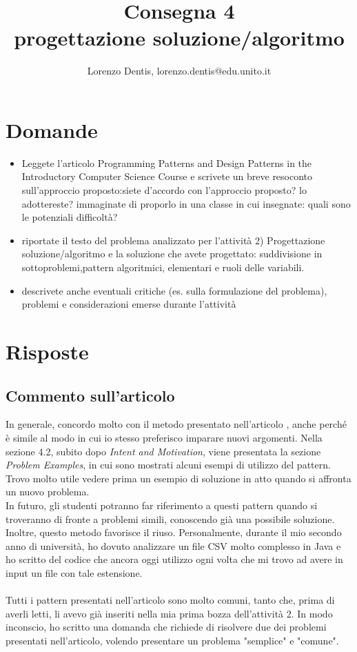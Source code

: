 \documentclass[a4paper]{article}
\begin{document}
\author{Lorenzo Dentis, lorenzo.dentis@edu.unito.it}
\title{Consegna 4 \\ \large progettazione soluzione/algoritmo}
\maketitle

\section{Domande}
\begin{itemize}
	\item Leggete l'articolo Programming Patterns and Design Patterns in the Introductory Computer Science Course e scrivete un breve resoconto sull'approccio proposto:siete d'accordo con l'approccio proposto? lo adottereste? immaginate di proporlo in una classe in cui insegnate: quali sono le potenziali difficoltà?
	\item riportate il testo del problema analizzato per l'attività 2) Progettazione soluzione/algoritmo e la soluzione che avete progettato: suddivisione in sottoproblemi,pattern algoritmici, elementari e ruoli delle variabili.
	\item descrivete anche eventuali critiche (es. sulla formulazione del problema), problemi e considerazioni emerse durante l'attività
\end{itemize}
\section{Risposte}
\subsection{Commento sull'articolo}
In generale, concordo molto con il metodo presentato nell'articolo \cite{articolo}, anche perché è simile al modo in cui io stesso preferisco imparare nuovi argomenti. 
Nella sezione 4.2, subito dopo \textit{Intent and Motivation}, viene presentata la sezione \textit{Problem Examples}, in cui sono mostrati alcuni esempi di utilizzo del pattern. 
Trovo molto utile vedere prima un esempio di soluzione in atto quando si affronta un nuovo problema.\\

In futuro, gli studenti potranno far riferimento a questi pattern quando si troveranno di fronte a problemi simili, conoscendo già una possibile soluzione.
Inoltre, questo metodo favorisce il riuso. 
Personalmente, durante il mio secondo anno di università, ho dovuto analizzare un file CSV molto complesso in Java e ho scritto del codice che ancora oggi utilizzo ogni volta che mi trovo ad avere in input un file con tale estensione.\\\\
Tutti i pattern presentati nell'articolo sono molto comuni, tanto che, prima di averli letti, li avevo già inseriti nella mia prima bozza dell'attività 2. In modo inconscio, ho scritto una domanda che richiede di risolvere due dei problemi presentati nell'articolo, volendo presentare un problema "semplice" e "comune".\\
\end{document}
